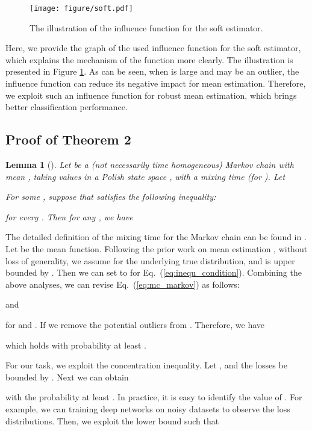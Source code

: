 \documentclass[11pt]{article}
\newtheorem{lemma}{Lemma}
\begin{document}
\begin{figure}[!h] 
\centering
\texttt{[image: figure/soft.pdf]}
\caption{The illustration of the influence function for the soft estimator.}
\label{fig:soft} 
\end{figure}
Here, we provide the graph of the used influence function for the soft estimator, which explains the mechanism of the function  more clearly. The illustration is presented in Figure \ref{fig:soft}. As can be seen, when  is large and may be an outlier, the influence function can reduce its negative impact for mean estimation. Therefore, we exploit such an influence function for robust mean estimation, which brings better classification performance.


\subsection{Proof of Theorem 2}



\begin{lemma}[\cite{paulin2015concentration}]
Let  be a (not necessarily time homogeneous) Markov chain with mean , taking values
in a Polish state space , with a mixing time  (for ). Let

For some , suppose that  satisfies the following inequality: 

for every . Then for any , we have 

\end{lemma}
The detailed definition of the mixing time for the Markov chain can be found in \cite{paulin2015concentration,roberts2004general}. 
Let  be the mean function. Following the prior work on mean estimation \cite{liu2019high,diakonikolas2020outlier,diakonikolas2019recent,niss2020you}, without loss of generality, we assume  for the underlying true distribution, and  is upper bounded by . Then we can set  to  for Eq.~(\ref{eq:inequ_condition}). Combining the above analyses, we can revise Eq.~(\ref{eq:mc_markov}) as follows:


and 

for  and . If we remove the potential outliers  from . Therefore, we have 

which holds with probability at least . 

For our task, we exploit the concentration inequality. Let , and the losses be bounded by . Next we can obtain



with the probability at least . In practice, it is easy to identify the value of . For example, we can training deep networks on noisy datasets to observe the loss distributions. Then, we exploit the lower bound such that
\end{document}
